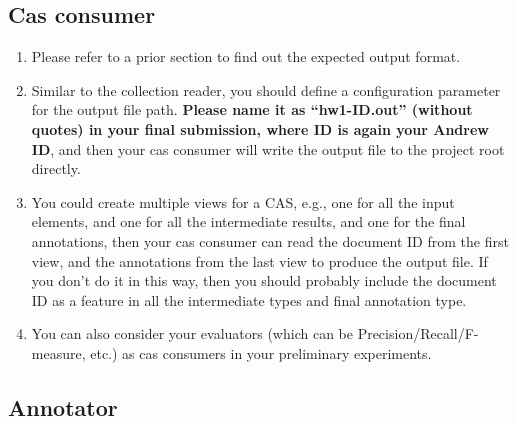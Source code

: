\subsection{Cas consumer}

\begin{enumerate}
  
\item Please refer to a prior section to find out the expected output format.

\item Similar to the collection reader, you should define a configuration
parameter for the output file path. \textbf{Please name it as ``hw1-ID.out''
(without quotes) in your final submission, where ID is again your Andrew ID},
and then your cas consumer will write the output file to the project root
directly.

\item You could create multiple views for a CAS, e.g., one for all the input
elements, and one for all the intermediate results, and one for the final
annotations, then your cas consumer can read the document ID from the first
view, and the annotations from the last view to produce the output file. If you
don't do it in this way, then you should probably include the document ID as a
feature in all the intermediate types and final annotation type.

\item You can also consider your evaluators (which can be
Precision/Recall/F-measure, etc.) as cas consumers in your preliminary
experiments.

\end{enumerate}

\subsection{Annotator}

